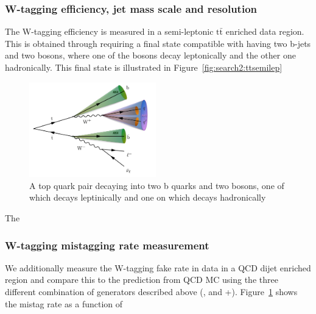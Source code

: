\subsubsection{W-tagging efficiency, jet mass scale and resolution} 

The W-tagging efficiency is measured in a semi-leptonic $\textrm{t}\bar{\textrm{t}}$ enriched data region. This is obtained through requiring a final state compatible with having two b-jets and two \PW bosons, where one of the bosons decay leptonically and the other one hadronically. This final state is illustrated in Figure~\ref{fig:search2:ttsemilep}

\begin{figure}[htbp]
\centering
\includegraphics[width=0.49\textwidth]{figures/analysis/search2/misc/semileptt.pdf}
\caption{A top quark pair decaying into two b quarks and two \PW bosons, one of which decays leptinically and one on which decays hadronically}
\label{fig:searchII:fakerate}
\end{figure}

The 
\subsubsection{W-tagging mistagging rate measurement} 

We additionally measure the W-tagging fake rate in data in a QCD dijet enriched region and compare this to the prediction from QCD MC using the three different combination of generators described above (\HERWIG{++}, \PYTHIA and \MADGRAPH+\PYTHIA).
Figure~\ref{fig:searchII:fakerate} shows the mistag rate as a function of \PT

